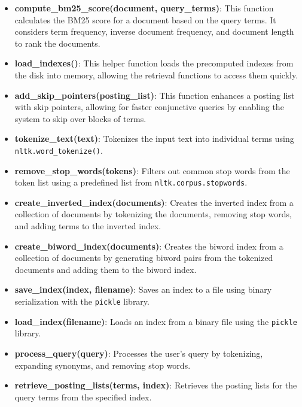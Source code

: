 \documentclass[a4paper,10pt]{article}
\begin{document}
\begin{itemize}
    \item \textbf{compute\_bm25\_score(document, query\_terms)}: This function calculates the BM25 score for a document based on the query terms. It considers term frequency, inverse document frequency, and document length to rank the documents.
    
    \item \textbf{load\_indexes()}: This helper function loads the precomputed indexes from the disk into memory, allowing the retrieval functions to access them quickly.
    
    \item \textbf{add\_skip\_pointers(posting\_list)}: This function enhances a posting list with skip pointers, allowing for faster conjunctive queries by enabling the system to skip over blocks of terms.
    
    \item \textbf{tokenize\_text(text)}: Tokenizes the input text into individual terms using \texttt{nltk.word\_tokenize()}.
    
    \item \textbf{remove\_stop\_words(tokens)}: Filters out common stop words from the token list using a predefined list from \texttt{nltk.corpus.stopwords}.
    
    \item \textbf{create\_inverted\_index(documents)}: Creates the inverted index from a collection of documents by tokenizing the documents, removing stop words, and adding terms to the inverted index.
    
    \item \textbf{create\_biword\_index(documents)}: Creates the biword index from a collection of documents by generating biword pairs from the tokenized documents and adding them to the biword index.
    
    \item \textbf{save\_index(index, filename)}: Saves an index to a file using binary serialization with the \texttt{pickle} library.
    
    \item \textbf{load\_index(filename)}: Loads an index from a binary file using the \texttt{pickle} library.
    
    \item \textbf{process\_query(query)}: Processes the user's query by tokenizing, expanding synonyms, and removing stop words.
    
    \item \textbf{retrieve\_posting\_lists(terms, index)}: Retrieves the posting lists for the query terms from the specified index.
    

\end{itemize}
\end{document}
